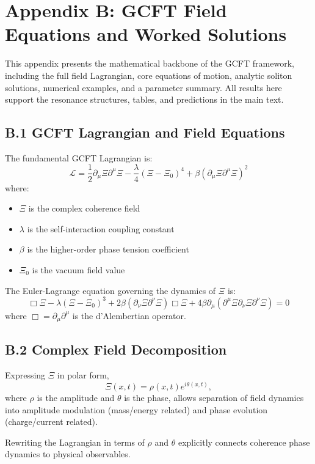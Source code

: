 \clearpage
\section*{Appendix B: GCFT Field Equations and Worked Solutions}

This appendix presents the mathematical backbone of the GCFT framework, including the full field Lagrangian, core equations of motion, analytic soliton solutions, numerical examples, and a parameter summary. All results here support the resonance structures, tables, and predictions in the main text.

\subsection*{B.1 GCFT Lagrangian and Field Equations}

The fundamental GCFT Lagrangian is:
\[
\mathcal{L} = \frac{1}{2} \partial_\mu \Xi \partial^\mu \Xi - \frac{\lambda}{4} (\Xi - \Xi_0)^4 + \beta \left(\partial_\mu \Xi \partial^\mu \Xi\right)^2
\]
where:
\begin{itemize}
  \item $\Xi$ is the complex coherence field
  \item $\lambda$ is the self-interaction coupling constant
  \item $\beta$ is the higher-order phase tension coefficient
  \item $\Xi_0$ is the vacuum field value
\end{itemize}

The Euler-Lagrange equation governing the dynamics of $\Xi$ is:
\[
\Box \Xi - \lambda (\Xi - \Xi_0)^3 + 2\beta (\partial_\nu \Xi \partial^\nu \Xi) \Box \Xi + 4\beta \partial_\mu (\partial^\mu \Xi \partial_\nu \Xi \partial^\nu \Xi) = 0
\]
where $\Box = \partial_\mu \partial^\mu$ is the d’Alembertian operator.

\subsection*{B.2 Complex Field Decomposition}

Expressing $\Xi$ in polar form,
\[
\Xi(x,t) = \rho(x,t) e^{i \theta(x,t)},
\]
where $\rho$ is the amplitude and $\theta$ is the phase, allows separation of field dynamics into amplitude modulation (mass/energy related) and phase evolution (charge/current related).

Rewriting the Lagrangian in terms of $\rho$ and $\theta$ explicitly connects coherence phase dynamics to physical observables.

